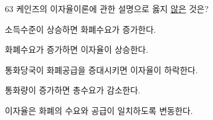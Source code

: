 \begin{question}{63}
케인즈의 이자율이론에 관한 설명으로 옳지 \uline{않은} 것은?
\begin{choices}
  \item 소득수준이 상승하면 화폐수요가 증가한다.
  \item 화폐수요가 증가하면 이자율이 상승한다.
  \item 통화당국이 화폐공급을 증대시키면 이자율이 하락한다.
  \item 통화량이 증가하면 총수요가 감소한다.
  \item 이자율은 화폐의 수요와 공급이 일치하도록 변동한다.
\end{choices}
\end{question}
